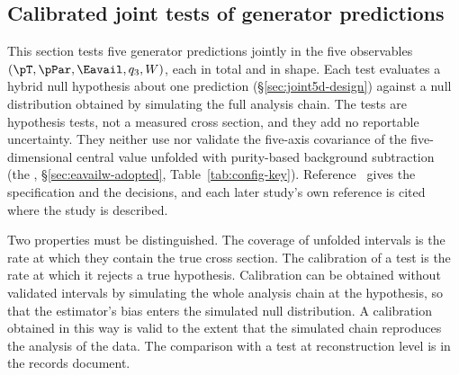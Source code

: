 \subsection{Calibrated joint tests of generator predictions}
\label{sec:joint5d}

This section tests five generator predictions jointly in the five observables $(\pT,\pPar,\Eavail,q_{3},W)$, each in total and in shape. Each test evaluates a hybrid null hypothesis about one prediction (\S\ref{sec:joint5d-design}) against a null distribution obtained by simulating the full analysis chain. The tests are hypothesis tests, not a measured cross section, and they add no reportable uncertainty. They neither use nor validate the five-axis covariance of the five-dimensional central value unfolded with purity-based background subtraction (the \estPurity{}, \S\ref{sec:eavailw-adopted}, Table~\ref{tab:config-key}). Reference~\cite{JointTestRecord2026} gives the specification and the decisions, and each later study's own reference is cited where the study is described.

Two properties must be distinguished.  The coverage of unfolded intervals is the rate at which they contain the true cross section.  The calibration of a test is the rate at which it rejects a true hypothesis.  Calibration can be obtained without validated intervals by simulating the whole analysis chain at the hypothesis, so that the estimator's bias enters the simulated null distribution.  A calibration obtained in this way is valid to the extent that the simulated chain reproduces the analysis of the data. The comparison with a test at reconstruction level is in the records document.

